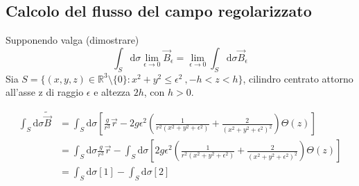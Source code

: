 
\subsection{Calcolo del flusso del campo regolarizzato}
\label{sec:flusso_regolarizzato}
Supponendo valga (dimostrare)
$$
  \int_S \mathrm{d}\sigma \lim_{\epsilon \to 0} \vec B_\epsilon = \lim_{\epsilon \to 0} \int_S \mathrm{d}\sigma \vec B_\epsilon
$$
Sia $S = \{(x,y,z) \in \mathbb{R}^3 \setminus \{0\} : x^2 + y^2 \leq \epsilon ^2\ ,-h<z<h\}$,
cilindro centrato attorno all'asse z di raggio $\epsilon$ e altezza $2h$, con $h>0$.

\begin{equation*}
   \begin{split}
      \int_S \mathrm{d}\sigma \tilde{\vec B}  &= \int_S \mathrm{d}\sigma \left[\frac{g}{r^3}\vec r
         - 2g\epsilon^2 \left( \frac{1}{r^2(x^2 + y^2 + \epsilon^2)}
               + \frac{2}{(x^2 + y^2 + \epsilon^2)^2}\right) \Theta(z)  \right] \\
         &= \int_S \mathrm{d}\sigma \frac{g}{r^3}\vec r
            - \int_S \mathrm{d}\sigma \left[ 2g\epsilon^2 \left( \frac{1}{r^2(x^2 + y^2 + \epsilon^2)}
                  + \frac{2}{(x^2 + y^2 + \epsilon^2)^2}\right) \Theta(z) \right] \\
          &= \int_S \mathrm{d}\sigma [1] - \int_S \mathrm{d}\sigma [2]
   \end{split}
\end{equation*}

